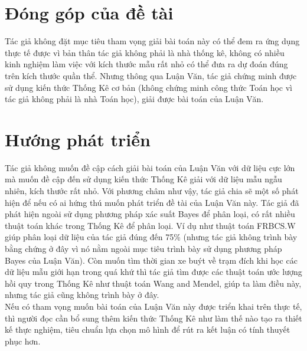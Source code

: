 \documentclass[a4paper, 13pt]{report}
\begin{document}
\section{Đóng góp của đề tài}
Tác giả không đặt mục tiêu tham vọng giải bài toán này có thể đem ra ứng dụng thực tế được vì bản thân tác giả không phải là nhà thống kê, không có nhiều kinh nghiệm làm việc với kích thước mẫu rất nhỏ có thể đưa ra dự đoán đúng trên kích thước quần thể. Nhưng thông qua Luận Văn, tác giả chứng minh được sử dụng kiến thức Thống Kê cơ bản (không chứng minh công thức Toán học vì tác giả không phải là nhà Toán học), giải được bài toán của Luận Văn.
\section{Hướng phát triển}
Tác giả không muốn đề cập cách giải bài toán của Luận Văn với dữ liệu cực lớn mà muốn đề cập đến sử dụng kiến thức Thống Kê giải với dữ liệu mẫu ngẫu nhiên, kích thước rất nhỏ. Với phương châm như vậy, tác giả chia sẽ một số phát hiện để nếu có ai hứng thú muốn phát triển đề tài của Luận Văn này. Tác giả đã phát hiện ngoài sử dụng phương pháp xác suất Bayes để phân loại, có rất nhiều thuật toán khác trong Thống Kê để phân loại. Ví dụ như thuật toán FRBCS.W giúp phân loại dữ liệu của tác giả đúng đến 75\% (nhưng tác giả không trình bày bằng chứng ở đây vì nó nằm ngoài mục tiêu trình bày sử dụng phương pháp Bayes của Luận Văn). Còn muốn tìm thời gian xe buýt về trạm đích khi học các dữ liệu mẫu giới hạn trong quá khứ thì tác giả tìm được các thuật toán ước lượng hồi quy trong Thống Kê như thuật toán Wang and Mendel, giúp ta làm điều này, nhưng tác giả cũng không trình bày ở đây.\\
Nếu có tham vọng muốn bài toán của Luận Văn này được triển khai trên thực tế, thì người đọc cần bổ sung thêm kiến thức Thống Kê như làm thế nào tạo ra thiết kế thực nghiệm, tiêu chuẩn lựa chọn mô hình để rút ra kết luận có tính thuyết phục hơn.
\pagebreak
\end{document}
